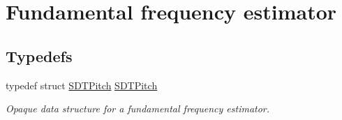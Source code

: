 \hypertarget{group__pitch}{}\section{Fundamental frequency estimator}
\label{group__pitch}
\subsection*{Typedefs}
\begin{DoxyCompactItemize}
\item 
\hypertarget{group__pitch_ga93a04dd02784981e8efabae71a248942}{}typedef struct \hyperlink{group__pitch_ga93a04dd02784981e8efabae71a248942}{S\+D\+T\+Pitch} \hyperlink{group__pitch_ga93a04dd02784981e8efabae71a248942}{S\+D\+T\+Pitch}\label{group__pitch_ga93a04dd02784981e8efabae71a248942}

\begin{DoxyCompactList}\small\item\em Opaque data structure for a fundamental frequency estimator. \end{DoxyCompactList}\end{DoxyCompactItemize}
